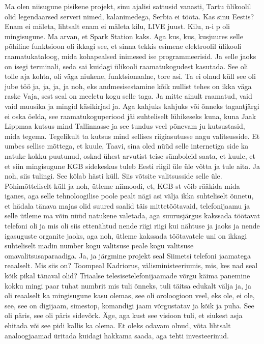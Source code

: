 Ma olen niisugune pisikene projekt, sinu ajalisi sattusid vanasti, Tartu ülikoolil olid legendaarsed serveri nimed, kalanimedega, Serbia ei tööta. Kas sinu Eestis?
Enam ei mäleta, lihtsalt enam ei mäleta kilu, LIVE juust. Kilu, n-i p oli mingisugune. Ma arvan, et Spark Station kaks.
Aga kus, kus, kusjuures selle põhiline funktsioon oli ikkagi see, et sinna tekkis esimene elektroolil ülikooli raamatukataloog, mida kohapealsed inimesed ise programmeerisid.
Ja selle jaoks on isegi terminali, seda sai kuidagi ülikooli raamatukogudest kasutada. See oli tolle aja kohta, oli väga niukene, funktsionaalne, tore asi.
Ta ei olnud küll see oli jube töö ja, ja, ja, ja noh, eks andmesisestamine kõik nullist tehes on ikka väga raske
Vaja, sest seal on meeletu kogu selle taga. Ja mitte ainult raamatud, vaid vaid muusika ja mingid käsikirjad ja.
Aga kahjuks kahjuks või õnneks tagantjärgi ei oska öelda, see raamatukoguperiood jäi suhteliselt lühikeseks kuna, kuna Jaak Lippmaa kutsus mind Tallinnasse ja see tundus veel põnevam ju kutsustasid, mida tegema. Tegelikult ta kutsus mind sellises riigiasutusse nagu valitsusside. Et umbes sellise mõttega, et kuule, Taavi, sina oled nüüd selle internetiga side ka natuke kokku puutunud, oskad ühest arvutist teise sümboleid saata, et kuule, et et siin mingisugune KGB sidekeskus tuleb Eesti riigil üle üle võtta ja tule aita. Ja noh, siis tulingi.
See kõlab hästi küll. Siis võtsite valitsusside selle üle.
Põhimõtteliselt küll ja noh, ütleme niimoodi, et,
KGB-st võib rääkida mida iganes, aga selle tehnoloogilise poole pealt nägi asi välja ikka suhteliselt õnnetu, et hädala tänava majas olid suured saalid täis mittetöötavaid, telefonijaamu ja selle ütleme ma võin nüüd natukene valetada, aga suurusjärgus kakssada töötavat telefoni oli ja mis oli siis ettenähtud nende riigi riigi kui nähtuse ja jaoks ja nende igasuguste organite jaoks, aga noh, ütleme kakssada töötavatele uni on ikkagi suhteliselt madin number kogu valitsuse peale kogu valitsuse omavalitsusaparaadiga. Ja, ja järgmine projekt seal Siimetsi telefoni jaamatega reaalselt. Mis siis on?
Toompeal Kadriorus, välisministeeriumis, mis, kes nad seal kõik pikal tänaval olid? Triaalse telesisetelefonijaamade võrgu käima panemine kokku mingi paar tuhat numbrit mis tuli õnneks, tuli täitsa edukalt välja ja, ja oli reaalselt ka mingisugune kasu olemas, see oli oroloogioon veel, eks ole, ei ole, see, see on digijaam, simestop, komandigi jaam võrgustatav ja kõik ja puha. See oli päris, see oli päris sidevõrk.
Äge, aga kust see visioon tuli, et siukest asja ehitada või see pidi kallis ka olema. Et oleks odavam olnud, võta lihtsalt analoogjaamad üritada kuidagi hakkama saada, aga tehti investeerinud.

